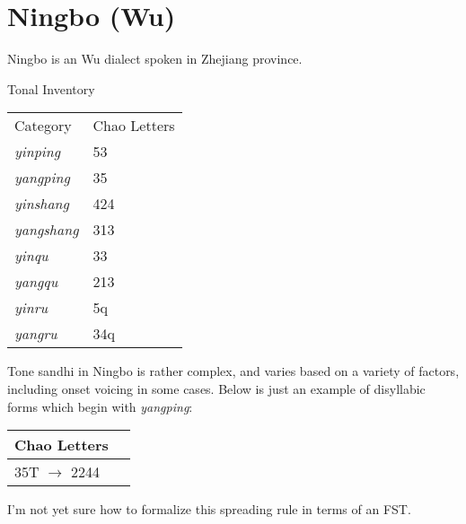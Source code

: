 \documentclass{article}
\begin{document}
\section{Ningbo (Wu)}
Ningbo is an Wu dialect spoken in Zhejiang province. \cite{Chan1985}
\begin{exe}
\ex Tonal Inventory \\
\begin{tabular}[t]{|ll|}
\hline
Category & Chao Letters \\
\textit{yinping} & 53 \\
\textit{yangping} & 35 \\
\textit{yinshang} & 424 \\
\textit{yangshang} & 313 \\
\textit{yinqu} & 33 \\
\textit{yangqu} & 213 \\
\textit{yinru} & 5q \\
\textit{yangru} & 34q \\
\hline
\end{tabular}
\end{exe}
Tone sandhi in Ningbo is rather complex, and varies based on a variety of factors, including onset voicing in some cases. Below is just an example of disyllabic forms which begin with \textit{yangping}:
\begin{exe}
\ex
\begin{tabular}[t]{ll}
Chao Letters \\
\hline
35T $\rightarrow$ 2244  \\ 
\end{tabular}
\end{exe}
I'm not yet sure how to formalize this spreading rule in terms of an FST.
\end{document}
